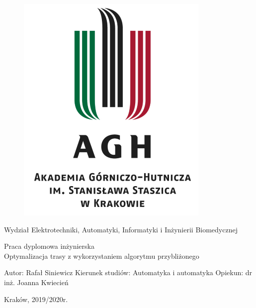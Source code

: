 \documentclass[a4paper, twoside, 12pt, justified]{article}
\begin{document}
	
	\begin{figure}[t]
		\includegraphics[scale=0.8]{AGH}
		\centering
	\end{figure}
	
	\begin{center}
		Wydział Elektrotechniki, Automatyki, Informatyki i Inżynierii Biomedycznej 
		\vspace{10mm} %
	
		Praca dyplomowa inżynierska \\ 
		\vspace{10mm}
		Optymalizacja trasy z wykorzystaniem algorytmu przybliżonego
	\end{center}
	
	\vfill
	\begin{flushleft}
		Autor: Rafał Siniewicz \newline
		Kierunek studiów: Automatyka i automatyka \newline 
		Opiekun: dr inż. Joanna Kwiecień \newline
	
	\end{flushleft}
	
	\begin{center}Kraków, 2019/2020r.\end{center}
	
	\newpage
	
\end{document}
